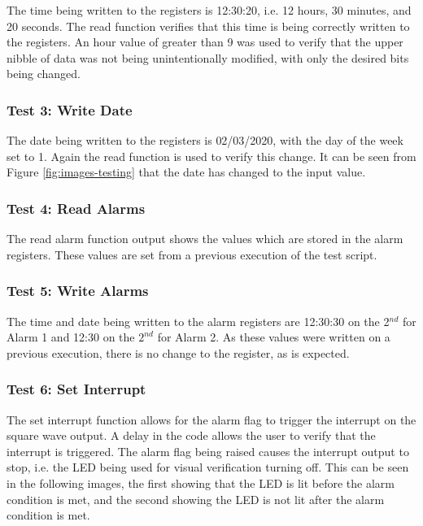 The time being written to the registers is 12:30:20, i.e. 12 hours, 30 minutes,
and 20 seconds. The read function verifies that this time is being correctly
written to the registers. An hour value of greater than 9 was used to verify
that the upper nibble of data was not being unintentionally modified, with only
the desired bits being changed.

\subsubsection{Test 3: Write Date}

The date being written to the registers is 02/03/2020, with the day of the week
set to 1. Again the read function is used to verify this change. It can be seen
from Figure \ref{fig:images-testing} that the date has changed to the input
value.

\subsubsection{Test 4: Read Alarms}

The read alarm function output shows the values which are stored in the alarm
registers. These values are set from a previous execution of the test script.

\subsubsection{Test 5: Write Alarms}

The time and date being written to the alarm registers are 12:30:30 on the
2$^{nd}$ for Alarm 1 and 12:30 on the  $2^{nd}$ for Alarm 2. As these values
were written on a previous execution, there is no change to the register, as is
expected.

\subsubsection{Test 6: Set Interrupt}

The set interrupt function allows for the alarm flag to trigger the interrupt on
the square wave output. A delay in the code allows the user to verify that the
interrupt is triggered. The alarm flag being raised causes the interrupt output
to stop, i.e. the LED being used for visual verification turning off. This can
be seen in the following images, the first showing that the LED is lit before
the alarm condition is met, and the second showing the LED is not lit after the
alarm condition is met.

